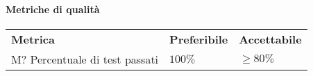     	\paragraph{Metriche di qualità}
    	\begin{longtable} {
    			>{}p{80mm} 
    			>{}p{25mm}
    			>{}p{25mm}
    		}
    		\rowcolor{gray!50}
    		\textbf{Metrica} & \textbf{Preferibile} & \textbf{Accettabile} \TBstrut \TBstrut \\
    		M? Percentuale di test passati & $100\%$ & $\ge 80\%$ \TBstrut \\ [2mm]
    	\end{longtable}
